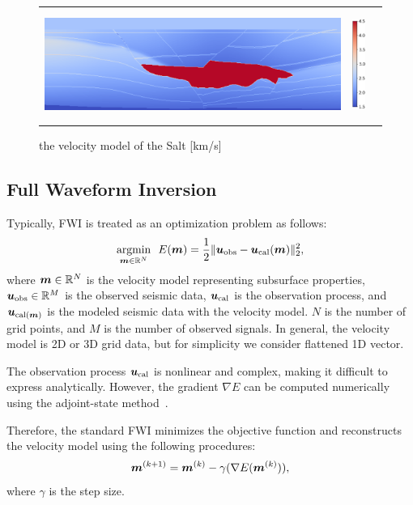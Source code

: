 \begin{figure}[htbp]
    \centering
    \begin{tabular}{m{118mm} m{10mm} m{0mm}}
        \begin{minipage}[b]{120mm}
            \centering
            \includegraphics[width=120mm]{public/full_true_vm}
        \end{minipage} &
        \begin{minipage}[b]{20mm}
            \centering
            \includegraphics[height=36mm]{public/color-bar}
        \end{minipage} &
    \end{tabular}
    \caption{the velocity model of the Salt [km/s]}
    \label{fig:salt-model}
\end{figure}



\subsection{Full Waveform Inversion}\label{subsec:full-waveform-inversion}
Typically, FWI is treated as an optimization problem as follows\cite{FWI0}:
\begin{equation} \label{eq:FWIObjective} \underset{\bm{m} \in \mathbb{R}^N}{\mathrm{argmin}} \ \ E(\bm{m}) = \frac {1} {2} \lVert  \bm{u}_{\mathrm{obs}} - \bm{u}_{\mathrm{cal}}(\bm{m})  \rVert _2^2, \end{equation}
where $\bm{m} \in \mathbb{R}^{N}$ is the velocity model representing subsurface properties, $\bm{u}_{\mathrm{obs}} \in \mathbb{R}^{M}$ is the observed seismic data, $\bm{u}_{\mathrm{cal}}$ is the observation process, and $\bm{u}_{\mathrm{cal}(\bm{m})}$ is the modeled seismic data with the velocity model.
$N$ is the number of grid points, and $M$ is the number of observed signals.
In general, the velocity model is 2D or 3D grid data, but for simplicity we consider flattened 1D vector.

The observation process $\bm{u}_{\mathrm{cal}}$ is nonlinear and complex, making it difficult to express analytically.
However, the gradient $\nabla E$ can be computed numerically using the adjoint-state method~\cite{FWI-gradient}.

Therefore, the standard FWI minimizes the objective function and reconstructs the velocity model using the following procedures:
\begin{equation} \label{eq:FWIWithGradient} \bm{m}^{(k+1)} = \bm{m}^{(k)} - \gamma( \nabla E(\bm{m}^{(k)}) ), \end{equation}
where $\gamma$ is the step size.

